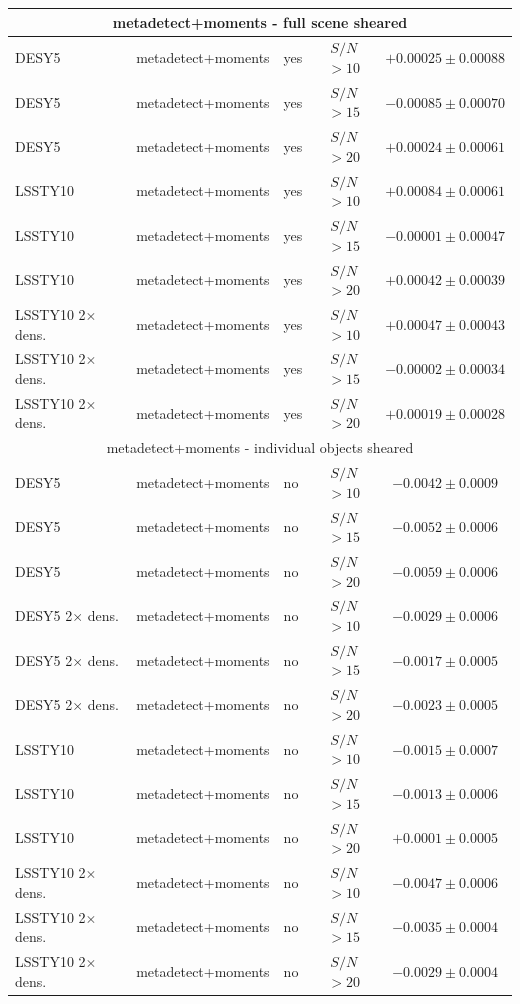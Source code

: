 \documentclass[fleqn,useAMS,usenatbib]{mnras}
\newcommand{\snr}{$S/N$}
\begin{document}
\begin{table}
\begin{tabular}{|l|l|l|c|c|}
    \hline
    \multicolumn{5}{c}{metadetect+moments - full scene sheared}\\
    \hline
    DESY5   & metadetect+moments & yes & \snr$ > 10$ & $+0.00025 \pm 0.00088$  \\
    DESY5   & metadetect+moments & yes & \snr$ > 15$ & $-0.00085 \pm 0.00070$  \\
    DESY5   & metadetect+moments & yes & \snr$ > 20$ & $+0.00024 \pm 0.00061$  \\
    \hline
    LSSTY10  & metadetect+moments & yes & \snr$ > 10$ & $+0.00084 \pm 0.00061$  \\
    LSSTY10  & metadetect+moments & yes & \snr$ > 15$ & $-0.00001 \pm 0.00047$  \\
    LSSTY10  & metadetect+moments & yes & \snr$ > 20$ & $+0.00042 \pm 0.00039$  \\
    \hline
    LSSTY10 2$\times$ dens. & metadetect+moments & yes & \snr$ > 10$ & $+0.00047 \pm 0.00043$  \\
    LSSTY10 2$\times$ dens. & metadetect+moments & yes & \snr$ > 15$ & $-0.00002 \pm 0.00034$  \\
    LSSTY10 2$\times$ dens. & metadetect+moments & yes & \snr$ > 20$ & $+0.00019 \pm 0.00028$  \\
    \hline

    \hline
    \multicolumn{5}{c}{metadetect+moments - individual objects sheared}\\
    \hline
    DESY5                 & metadetect+moments & no & \snr$ > 10$ & $-0.0042 \pm 0.0009$  \\
    DESY5                 & metadetect+moments & no & \snr$ > 15$ & $-0.0052 \pm 0.0006$  \\
    DESY5                 & metadetect+moments & no & \snr$ > 20$ & $-0.0059 \pm 0.0006$  \\
    \hline
    DESY5 2$\times$ dens. & metadetect+moments & no & \snr$ > 10$ & $-0.0029 \pm 0.0006$  \\
    DESY5 2$\times$ dens. & metadetect+moments & no & \snr$ > 15$ & $-0.0017 \pm 0.0005$  \\
    DESY5 2$\times$ dens. & metadetect+moments & no & \snr$ > 20$ & $-0.0023 \pm 0.0005$  \\
    \hline
    LSSTY10                 & metadetect+moments & no & \snr$ > 10$ & $-0.0015 \pm 0.0007$  \\
    LSSTY10                 & metadetect+moments & no & \snr$ > 15$ & $-0.0013 \pm 0.0006$  \\
    LSSTY10                 & metadetect+moments & no & \snr$ > 20$ & $+0.0001 \pm 0.0005$  \\
    \hline
    LSSTY10 2$\times$ dens. & metadetect+moments & no & \snr$ > 10$ & $-0.0047 \pm 0.0006$  \\
    LSSTY10 2$\times$ dens. & metadetect+moments & no & \snr$ > 15$ & $-0.0035 \pm 0.0004$  \\
    LSSTY10 2$\times$ dens. & metadetect+moments & no & \snr$ > 20$ & $-0.0029 \pm 0.0004$  \\
    \hline
  \end{tabular}

\end{table}
\end{document}

